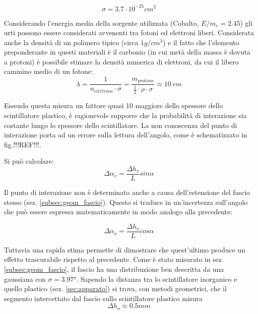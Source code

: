 \documentclass[11pt]{article}
\begin{document}
\begin{equation}
\sigma = 3.7 \cdot 10^{-25} cm^2
\nonumber
\end{equation}

Considerando l'energia media della sorgente utilizzata (Cobalto, $E/m_e = 2.45$) gli urti possono essere considerati avvenenti tra fotoni ed elettroni liberi. Considerata anche la densità di un polimero tipico (circa $1 g/cm^3$) e il fatto che l'elemento preponderante in questi materiali è il carbonio (in cui metà della massa è dovuta a protoni) è possibile stimare la densità numerica di elettroni, da cui il libero cammino medio di un fotone: \\
 
\begin{equation}
\lambda = \frac{1}{n_{elettroni} \cdot \sigma} = \frac{m_{protone}}{\frac{1}{2} \cdot \rho \cdot \sigma} \approx 10 \ cm
\nonumber
\end{equation}

Essendo questa misura un fattore quasi 10 maggiore dello spessore dello scintillatore plastico, è ragionevole supporre che la probabilità di interazione sia costante lungo lo spessore dello scintillatore. La non conoscenza del punto di interazione porta ad un errore sulla lettura dell'angolo, come è schematizzato in fig.!!!REF!!!. 


Si può calcolare:
\begin{equation}
\Delta \alpha_v = \frac{\Delta h_v}{L} sin\alpha
\nonumber
\end{equation}

Il punto di interazione non è determinato anche a causa dell'estensione del fascio stesso (sez. \ref{subsec:geom_fascio}). Questo si traduce in un'incertezza sull'angolo che può essere espressa matematicamente in modo analogo alla precedente:

\begin{equation}
\Delta \alpha_o = \frac{\Delta h_o}{L} cos\alpha
\nonumber
\end{equation}

Tuttavia una rapida stima permette di dimostrare che quest'ultimo produce un effetto trascurabile rispetto al precedente. Come è stato misurato in sez. \ref{subsec:geom_fascio}, il fascio ha una distribuzione ben descritta da una gaussiana con $\sigma = 3.97 °$. Sapendo la distanza tra lo scintillatore inorganico e quello plastico (sez. \ref{sec:apparato}) si trova, con metodi geometrici, che il segmento intercettato dal fascio sullo scintillatore plastico misura \\
\begin{equation}
\Delta h_o \approx 0.5 mm
\end{equation}
\end{document}
